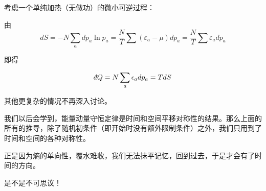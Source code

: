 \documentclass[CJK]{beamer}
\begin{document}
\begin{frame}
\bch
考虑一个单纯加热（无做功）的微小可逆过程：

由
$$dS = -N \sum_a dp_a \ln p_a = \frac{N}{T}\sum (\varepsilon_a-\mu) dp_a = \frac{N}{T}\sum \varepsilon_a  dp_a $$

即得

$$\dbar Q = N\sum_a \epsilon_a d p_a = T dS $$

其他更复杂的情况不再深入讨论。

\ech
\end{frame}

\begin{frame}
\bch
我们以后会学到，能量动量守恒定律是时间和空间平移对称性的结果。那么上面的所有的推导，除了随机初条件（即开始时没有额外限制条件）之外，我们只用到了时间和空间的各种对称性。

\skipline
正是因为熵的单向性，覆水难收，我们无法抹平记忆，回到过去，于是才会有了时间的方向。


是不是不可思议！

\ech
\end{frame}



\begin{frame}
\bch

\ech
\end{frame}
\end{document}
